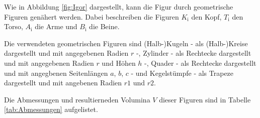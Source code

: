   Wie in Abbildung \ref{fig:Igor} dargestellt, kann die Figur durch geometrische Figuren
  genähert werden. Dabei beschreiben die Figuren $K_\text{i}$ den Kopf, $T_\text{i}$ 
  den Torso, $A_\text{i}$ die Arme und $B_\text{i}$ die Beine.
  
  Die verwendeten geometrischen Figuren sind 
  (Halb-)Kugeln - als (Halb-)Kreise dargestellt und mit angegebenen Radien $r$ -, 
  Zylinder - als Rechtecke dargestellt und mit angegebenen Radien $r$ und Höhen $h$ -, 
  Quader - als Rechtecke dargestellt und mit angegbenen Seitenlängen $a$, $b$, $c$ -
  und Kegelstümpfe - als Trapeze dargestellt und mit angebenen Radien $r1$ und $r2$.

  Die Abmessungen und resultierneden Volumina $V$ dieser Figuren sind in Tabelle
  \ref{tab:Abmessungen} aufgelistet.


